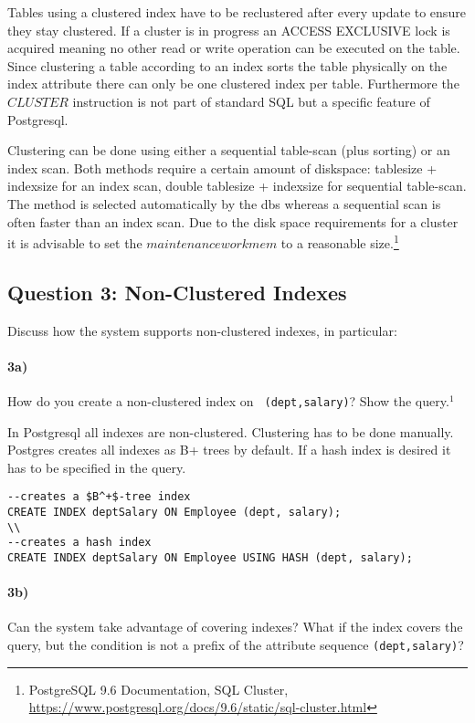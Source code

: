 \documentclass[11pt]{scrartcl}
\begin{document}
Tables using a clustered index have to be reclustered after every update to ensure they stay clustered.
If a cluster is in progress an ACCESS EXCLUSIVE lock is acquired meaning no other read or write operation can be executed
on the table.
Since clustering a table according to an index sorts the table physically on the index attribute there can only be one clustered index per table.
Furthermore the $CLUSTER$ instruction is not part of standard SQL but a specific feature of Postgresql.

Clustering can be done using either a sequential table-scan (plus sorting) or an index scan. Both methods require a certain amount of diskspace: tablesize + indexsize for an index scan, double tablesize + indexsize for sequential table-scan.
The method is selected automatically by the dbs whereas a sequential scan is often faster than an index scan. Due to the disk space requirements for a cluster it is advisable to set the $maintenance work mem$ to a reasonable size.\footnote{PostgreSQL 9.6
  Documentation, SQL Cluster,
  \url{https://www.postgresql.org/docs/9.6/static/sql-cluster.html}}

\subsection*{Question 3: Non-Clustered Indexes}

Discuss how the system supports non-clustered indexes, in
particular:

\paragraph{3a)} How do you create a non-clustered index on {\tt
  (dept,salary)}? Show the query.$^1$

In Postgresql all indexes are non-clustered. Clustering has to be done manually.
Postgres creates all indexes as B+ trees by default. If a hash index is desired it has to be specified in the query.

{\small
\begin{verbatim}
--creates a $B^+$-tree index
CREATE INDEX deptSalary ON Employee (dept, salary);
\\
--creates a hash index
CREATE INDEX deptSalary ON Employee USING HASH (dept, salary);
\end{verbatim}
}

\paragraph{3b)} Can the system take advantage of covering indexes? What if the
index covers the query, but the condition is not a prefix of the
attribute sequence {\tt (dept,salary)}?
\end{document}
